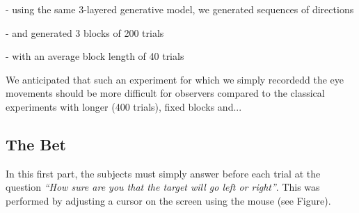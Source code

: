 \documentclass[profile,final,english, draft]{article}%
\begin{document}
- using the same 3-layered generative model, we generated sequences of directions

- and generated 3 blocks of 200 trials

- with an average block length of 40 trials

We anticipated that such an  experiment for which we simply recordedd the eye movements should be more difficult for observers compared to the classical experiments with longer (400 trials), fixed blocks and...

\subsection{The Bet}
In this first part, the subjects must simply answer before each trial at the question \textit{ ``How sure are you that the target will go left or right''}. This was performed by adjusting a cursor on the screen using the mouse (see Figure).



\end{document}
